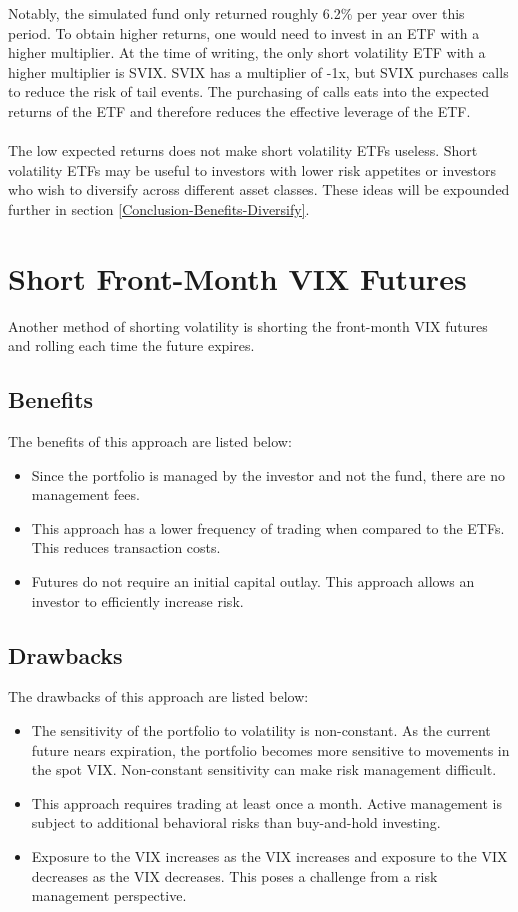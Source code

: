 \documentclass[11pt, oneside]{book}
\begin{document}
\noindent
Notably, the simulated fund only returned roughly 6.2\% per year over this period. To obtain higher returns, one would need to invest in an ETF with a higher multiplier. At the time of writing, the only short volatility ETF with a higher multiplier is SVIX. SVIX has a multiplier of -1x, but SVIX purchases calls to reduce the risk of tail events. The purchasing of calls eats into the expected returns of the ETF and therefore reduces the effective leverage of the ETF.\\
\\
The low expected returns does not make short volatility ETFs useless. Short volatility ETFs may be useful to investors with lower risk appetites or investors who wish to diversify across different asset classes. These ideas will be expounded further in section \ref{Conclusion-Benefits-Diversify}.

\section{Short Front-Month VIX Futures} \label{Investing-ShortFrontFut}
Another method of shorting volatility is shorting the front-month VIX futures and rolling each time the future expires. 

\subsection{Benefits} \label{Investing-ShortFrontFut-Benefit}
The benefits of this approach are listed below:
\begin{itemize}
    \item Since the portfolio is managed by the investor and not the fund, there are no management fees.
    \item This approach has a lower frequency of trading when compared to the ETFs. This reduces transaction costs.
    \item Futures do not require an initial capital outlay. This approach allows an investor to efficiently increase risk.
\end{itemize}

\subsection{Drawbacks} \label{Investing-ShortFrontFut-Drawback}
The drawbacks of this approach are listed below:
\begin{itemize}
    \item The sensitivity of the portfolio to volatility is non-constant. As the current future nears expiration, the portfolio becomes more sensitive to movements in the spot VIX. Non-constant sensitivity can make risk management difficult.
    \item This approach requires trading at least once a month. Active management is subject to additional behavioral risks than buy-and-hold investing.
    \item Exposure to the VIX increases as the VIX increases and exposure to the VIX decreases as the VIX decreases. This poses a challenge from a risk management perspective.
\end{itemize}
\newpage
\end{document}
